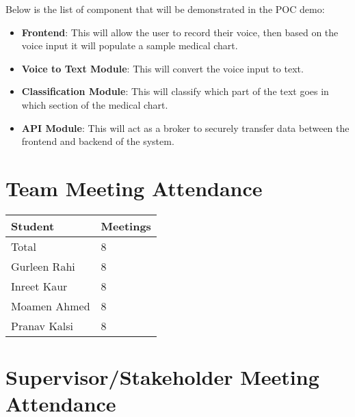 \documentclass{article}
\begin{document}
Below is the list of component that will be demonstrated in the POC demo:
\begin{itemize}
  \item \textbf{Frontend}: This will allow the user to record their voice, then based on the voice input it will populate a sample medical chart.
  \item \textbf{Voice to Text Module}: This will convert the voice input to text.
  \item \textbf{Classification Module}: This will classify which part of the text goes in which section of the medical chart.
  \item \textbf{API Module}: This will act as a broker to securely transfer data between the frontend and backend of the system.
\end{itemize}

\section{Team Meeting Attendance}


\begin{table}[H]
\centering
\begin{tabular}{ll}
\toprule
\textbf{Student} & \textbf{Meetings}\\
\midrule
Total & 8\\
Gurleen Rahi & 8 \\
Inreet Kaur & 8 \\
Moamen Ahmed & 8 \\
Pranav Kalsi & 8 \\
\bottomrule
\end{tabular}
\end{table}


\section{Supervisor/Stakeholder Meeting Attendance}

\end{document}

